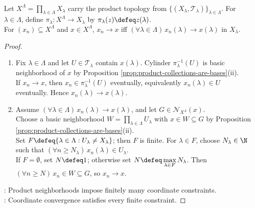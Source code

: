 \begin{proposition} \label{prop:product-topology-pointwise-convergence} \\
Let $X^\Lambda=\prod\limits_{\lambda\in\Lambda}X_\lambda$ carry the product topology from $\{(X_\lambda,\mathcal{T}_\lambda)\}_{\lambda\in\Lambda}$. For $\lambda\in\Lambda$, define $\pi_\lambda:X^\Lambda\to X_\lambda$ by $\pi_\lambda(z)\defeq z(\lambda)$.\\
For $(x_n)\subseteq X^\Lambda$ and $x\in X^\Lambda$, $x_n\to x$ iff $(\forall\lambda\in\Lambda)\,x_n(\lambda)\to x(\lambda)$ in $X_\lambda$.
\begin{proof}
\begin{enumerate}[label=\roman*.]
\setlength{\itemsep}{0pt}
\item[$(\Rightarrow)$] Fix $\lambda\in\Lambda$ and let $U\in\mathcal{T}_\lambda$ contain $x(\lambda)$. Cylinder $\pi_\lambda^{-1}(U)$ is basic neighborhood of $x$ by Proposition \ref{prop:product-collections-are-bases}(ii).\\
If $x_n\to x$, then $x_n\in\pi_\lambda^{-1}(U)$ eventually, equivalently $x_n(\lambda)\in U$ eventually. Hence $x_n(\lambda)\to x(\lambda)$.
\item[$(\Leftarrow)$] Assume $(\forall\lambda\in\Lambda)\,x_n(\lambda)\to x(\lambda)$, and let $G\in\mathcal{N}_{X^\Lambda}(x)$.\\
Choose a basic neighborhood $W=\prod\limits_{\lambda\in\Lambda}U_\lambda$ with $x\in W\subseteq G$ by Proposition \ref{prop:product-collections-are-bases}(ii).\\
Set $F\defeq\{\lambda\in\Lambda:U_\lambda\neq X_\lambda\}$; then $F$ is finite. For $\lambda\in F$, choose $N_\lambda\in\N$ such that $(\forall n\geq N_\lambda)\,x_n(\lambda)\in U_\lambda$.\\
If $F=\emptyset$, set $N\defeq1$; otherwise set $N\defeq\max\limits_{\lambda\in F}N_\lambda$. Then $(\forall n\geq N)\,x_n\in W\subseteq G$, so $x_n\to x$.
\end{enumerate}
: Product neighborhoods impose finitely many coordinate constraints.\\
: Coordinate convergence satisfies every finite constraint.
\end{proof}
\end{proposition}

